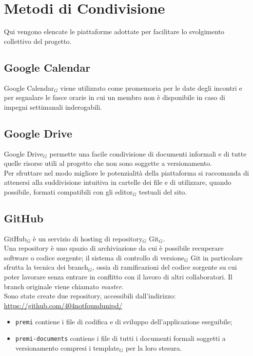 \section{Metodi di Condivisione}
Qui vengono elencate le piattaforme adottate per facilitare lo svolgimento collettivo del progetto.

\subsection{Google Calendar}
Google Calendar$_{G}$ viene utilizzato come promemoria per le date degli incontri e per segnalare le fasce orarie in cui un membro non è disponibile in caso di impegni settimanali inderogabili.

\subsection{Google Drive}
Google Drive$_{G}$ permette una facile condivisione di documenti informali e di tutte quelle risorse utili al progetto che non sono soggette a versionamento. \\
Per sfruttare nel modo migliore le potenzialità della piattaforma si raccomanda di attenersi alla suddivisione intuitiva in cartelle dei file e di utilizzare, quando possibile, formati compatibili con gli editor$_{G}$ testuali del sito.

\subsection{GitHub}
GitHub$_{G}$ è un servizio di hosting di repository$_{G}$ Git$_{G}$. \\
Una repository è uno spazio di archiviazione da cui è possibile recuperare software o codice sorgente; il sistema di controllo di versione$_{G}$ Git in particolare sfrutta la tecnica dei branch$_{G}$, ossia di ramificazioni del codice sorgente su cui poter lavorare senza  entrare in conflitto con il lavoro di altri collaboratori. Il branch originale viene chiamato \textit{master}. \\
Sono state create due repository, accessibili dall'indirizzo:\\ 
\url{https://github.com/404notfoundunipd/}
\begin{itemize}
\item \texttt{premi} contiene i file di codifica e di sviluppo dell'applicazione eseguibile;
\item \texttt{premi-documents} contiene i file di tutti i documenti formali soggetti a versionamento compresi i template$_{G}$ per la loro stesura.
\end{itemize}

